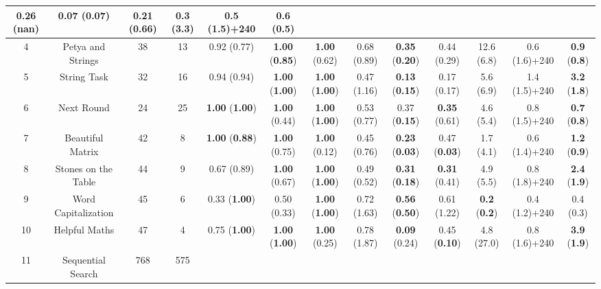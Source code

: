 \documentclass[10pt,conference]{IEEEtran}
\begin{document}
\begin{table}[hb!]
{\begin{tabular}{ |c|c|c|c|ccc|ccc|ccc| }
            0.26 (nan) & \textbf{0.07} (\textbf{0.07}) & 0.21 (0.66) & 
            \textbf{0.3} (3.3) & 0.5 (1.5)+240 & 0.6 (\textbf{0.5}) \\
            \hline
            4 & Petya and Strings & 38 & 13 & 
            0.92 (0.77)& \textbf{1.00} (\textbf{0.85}) & \textbf{1.00} (0.62) & 
            0.68 (0.89) & \textbf{0.35} (\textbf{0.20}) & 0.44 (0.29) & 
            12.6 (6.8) & 0.6 (1.6)+240 & \textbf{0.9} (\textbf{0.8}) \\
            \hline
            5 & String Task & 32 & 16 & 
            0.94 (0.94)& \textbf{1.00} (\textbf{1.00}) & \textbf{1.00} (\textbf{1.00}) & 
            0.47 (1.16) & \textbf{0.13} (\textbf{0.15}) & 0.17 (0.17) & 
            5.6 (6.9) & 1.4 (1.5)+240 & \textbf{3.2} (\textbf{1.8}) \\
            \hline
            6 & Next Round & 24 & 25 & 
            \textbf{1.00} (\textbf{1.00})& \textbf{1.00} (0.44) & \textbf{1.00} (\textbf{1.00}) & 
            0.53 (0.77) & 0.37 (\textbf{0.15}) & \textbf{0.35} (0.61) & 
            4.6 (5.4) & 0.8 (1.5)+240 & \textbf{0.7} (\textbf{0.8}) \\
            \hline
            7 & Beautiful Matrix & 42 & 8 & 
            \textbf{1.00} (\textbf{0.88})& \textbf{1.00} (0.75) & \textbf{1.00} (0.12) & 
            0.45 (0.76) & \textbf{0.23} (\textbf{0.03}) & 0.47 (\textbf{0.03}) & 
            1.7 (4.1) & 0.6 (1.4)+240 & \textbf{1.2} (\textbf{0.9}) \\
            \hline
            8 & Stones on the Table & 44 & 9 & 
            0.67 (0.89)& \textbf{1.00} (0.67) & \textbf{1.00} (\textbf{1.00}) & 
            0.49 (0.52) & \textbf{0.31} (\textbf{0.18}) & \textbf{0.31} (0.41) & 
            4.9 (5.5) & 0.8 (1.8)+240 & \textbf{2.4} (\textbf{1.9}) \\
            \hline
            9 & Word Capitalization & 45 & 6 & 
            0.33 (\textbf{1.00})& 0.50 (0.33) & \textbf{1.00} (\textbf{1.00}) & 
            0.72 (1.63) & \textbf{0.56} (\textbf{0.50}) & 0.61 (1.22) & 
            \textbf{0.2} (\textbf{0.2}) & 0.4 (1.2)+240 & 0.4 (0.3) \\
            \hline
            10 & Helpful Maths & 47 & 4 & 
            0.75 (\textbf{1.00})& \textbf{1.00} (\textbf{1.00}) & \textbf{1.00} (0.25) & 
            0.78 (1.87) & \textbf{0.09} (0.24) & 0.45 (\textbf{0.10}) & 
            4.8 (27.0) & 0.8 (1.6)+240 & \textbf{3.9} (\textbf{1.9}) \\
            \hline
            11 & Sequential Search & 768 & 575 & 

\end{tabular}}
\end{table}
\end{document}
